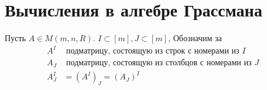 

\section{Вычисления в алгебре Грассмана}
Пусть $A \in M(m, n, R)$. $I \subset [m], J \subset[m]$,
Обозначим за \begin{align*}
                 A^I& \text{ подматрицу, состоящую из строк с номерами из }I\\ A_J& \text{ подматрицу, состоящую из столбцов с номерами из }J\\A^I_J& = (A^I)_J = (A_J)^I
\end{align*}

